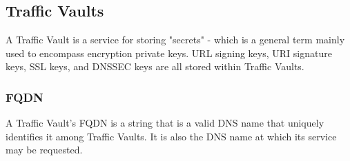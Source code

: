 %
%

\subsection{Traffic Vaults}
A Traffic Vault is a service for storing "secrets" - which is a general term
mainly used to encompass encryption private keys. URL signing keys, URI
signature keys, SSL keys, and DNSSEC keys are all stored within Traffic Vaults.



\subsubsection{FQDN}
A Traffic Vault's FQDN is a string that is a valid DNS name that uniquely
identifies it among Traffic Vaults. It is also the DNS name at which its service
may be requested.
